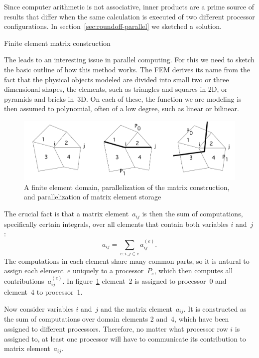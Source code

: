 Since computer arithmetic is not associative, inner products are a prime
source of results that differ when the same calculation is executed of
two different processor configurations. In section~\ref{sec:roundoff-parallel}
we sketched a solution.


 {Finite element matrix construction}
\label{sec:fem-assembly}

The  leads to an interesting issue in parallel
computing. For this we need to sketch the basic outline of how this
method works. The \ac{FEM} derives its name from the fact that the
physical objects modeled are divided into small two or three
dimensional shapes, the elements, such as triangles and squares in 2D,
or pyramids and bricks in~3D. On each of these, the function we are
modeling is then assumed to polynomial, often of a low degree, such as
linear or bilinear.

\begin{figure}[ht]
  \includegraphics[scale=.12]{graphics/fem}  
  \caption{A finite element domain, parallelization of the matrix
    construction, and parallelization of matrix element storage}
  \label{fig:fem-assembly}
\end{figure}

The crucial fact is that a matrix element~$a_{ij}$ is then the sum of
computations, specifically certain integrals, over all elements that
contain both variables $i$ and~$j$:
\[ a_{ij}=\sum_{e\colon i,j\in e} a^{(e)}_{ij}. \]
The computations in each element share many common parts, so it is
natural to assign each element~$e$ uniquely to a processor~$P_e$,
which then computes all contributions~$a^{(e)}_{ij}$. In
figure~\ref{fig:fem-assembly} element~2 is assigned to processor~0
and element~4 to processor~1.

Now consider variables $i$ and~$j$ and the matrix
element~$a_{ij}$.  It is constructed as the sum of computations over
domain elements 2 and~4, which have been assigned to different processors.
Therefore, no matter what processor row $i$ is assigned to, at least
one processor will have to communicate its contribution to matrix
element~$a_{ij}$.

